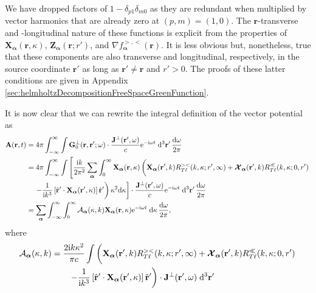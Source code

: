 \documentclass{article}
\begin{document}
We have dropped factors of $1 - \delta_{p1}\delta_{m0}$ as they are redundant when multiplied by vector harmonics that are already zero at $(p,m) = (1,0)$. The $\mathbf{r}$-transverse and -longitudinal nature of these functions is explicit from the properties of $\mathbf{X}_{\bm{\alpha}}(\mathbf{r},\kappa)$, $\mathbf{Z}_{\bm{\alpha}}(\mathbf{r};r')$, and $\nabla f_{\bm{\alpha}}^{>,<}(\mathbf{r})$. It is less obvious but, nonetheless, true that these components are also transverse and longitudinal, respectively, in the source coordinate $\mathbf{r}'$ as long as $\mathbf{r}'\neq\mathbf{r}$ and $r' > 0$. The proofs of these latter conditions are given in Appendix \ref{sec:helmholtzDecompositionFreeSpaceGreenFunction}.

It is now clear that we can rewrite the integral definition of the vector potential as
\begin{equation}
\begin{split}
\mathbf{A}(\mathbf{r},t) &= 4\pi\int_{-\infty}^{\infty}\int\mathbf{G}_0^\perp(\mathbf{r},\mathbf{r}';\omega)\cdot\frac{\mathbf{J}^\perp(\mathbf{r}',\omega)}{c}\mathrm{e}^{-\mathrm{i}\omega t}\;\mathrm{d}^3\mathbf{r}'\,\frac{\mathrm{d}\omega}{2\pi}\\
&= 4\pi\int_{-\infty}^\infty\int\left[\frac{\mathrm{i}k}{2\pi^2}\sum_{\bm{\alpha}}\int_0^\infty\mathbf{X}_{\bm{\alpha}}(\mathbf{r},\kappa)\left( \vphantom{\frac{1}{4\pi k^2}} \mathbf{X}_{\bm{\alpha}}(\mathbf{r}',k)R_{T\ell}^{><}(k,\kappa;r',\infty) + \bm{\mathcal{X}}_{\bm{\alpha}}(\mathbf{r}',k)R_{T\ell}^\ll(k,\kappa;0,r')\right.\right.\\
&\quad\left.\left.- \frac{1}{\mathrm{i} k^3}\left[\hat{\mathbf{r}}'\cdot\mathbf{X}_{\bm{\alpha}}(\mathbf{r}',\kappa)\right]\hat{\mathbf{r}}'\right)\kappa^2\mathrm{d}\kappa \vphantom{\int_0^\infty} \right]\cdot\frac{\mathbf{J}^\perp(\mathbf{r}',\omega)}{c}\mathrm{e}^{-\mathrm{i}\omega t}\;\mathrm{d}^3\mathbf{r}'\,\frac{\mathrm{d}\omega}{2\pi}\\
&= \sum_{\bm{\alpha}}\int_{-\infty}^\infty\int_0^\infty\mathcal{A}_{\bm{\alpha}}(\kappa,k)\mathbf{X}_{\bm{\alpha}}(\mathbf{r},\kappa)\mathrm{e}^{-\mathrm{i}\omega t}\;\mathrm{d}\kappa\,\frac{\mathrm{d}\omega}{2\pi},
\end{split}
\end{equation}
where
\begin{equation}\label{eq:AconnectionFunction}
\begin{split}
\mathcal{A}_{\bm{\alpha}}(\kappa,k) &= \frac{2\mathrm{i}k\kappa^2}{\pi c}\int\left( \vphantom{\frac{1}{k^3}} \mathbf{X}_{\bm{\alpha}}(\mathbf{r}',k)R_{T\ell}^{><}(k,\kappa;r',\infty) + \bm{\mathcal{X}}_{\bm{\alpha}}(\mathbf{r}',k)R^\ll_{T\ell}(k,\kappa;0,r')\right.\\
&\qquad\left.- \frac{1}{\mathrm{i}k^3}\left[\hat{\mathbf{r}}'\cdot\mathbf{X}_{\bm{\alpha}}(\mathbf{r}',\kappa)\right]\hat{\mathbf{r}}'\right)\cdot\mathbf{J}^\perp(\mathbf{r}',\omega)\;\mathrm{d}^3\mathbf{r}'
\end{split}
\end{equation}
\end{document}
